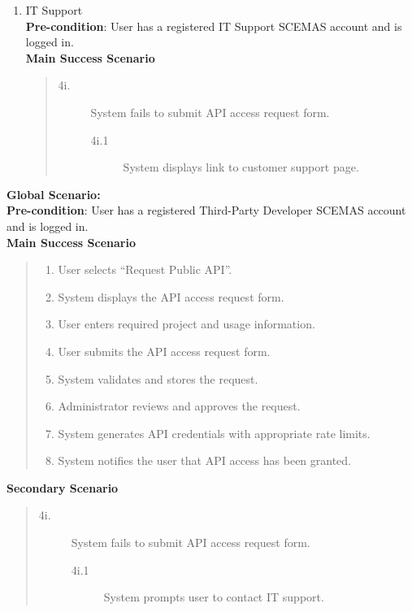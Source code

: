 \documentclass[]{article}
\begin{document}
\begin{enumerate}[{\bf BE7.}]
\begin{enumerate}[{\bf VP1.}]
            \item IT Support \\
    \textbf{Pre-condition}: User has a registered IT Support SCEMAS account and is logged in.\\
    \textbf{Main Success Scenario}
    \begin{quote}
        \begin{description}
            \item[\textmd{4i.}] System fails to submit API access request form.
            \begin{description}
                \item[\textmd{4i.1}] System displays link to customer support page.
            \end{description}
        \end{description}
    \end{quote}


        \end{enumerate}
        {\bf Global Scenario:} \\
                \textbf{Pre-condition}: User has a registered Third-Party Developer SCEMAS account and is logged in.\\
                \textbf{Main Success Scenario}
                \begin{quote}
                    \begin{enumerate}[1.]
                        \item User selects ``Request Public API''.
                        \item System displays the API access request form.
                        \item User enters required project and usage information.
                        \item User submits the API access request form.
                        \item System validates and stores the request.
                        \item Administrator reviews and approves the request.
                        \item System generates API credentials with appropriate rate limits.
                        \item System notifies the user that API access has been granted.
                    \end{enumerate}
                \end{quote}

                \textbf{Secondary Scenario}
                \begin{quote}
                    \begin{description}
                        \item[\textmd{4i.}] System fails to submit API access request form.
                        \begin{description}
                            \item[\textmd{4i.1}] System prompts user to contact IT support.
                        \end{description}


\end{description}
\end{quote}
\end{enumerate}
\end{document}

